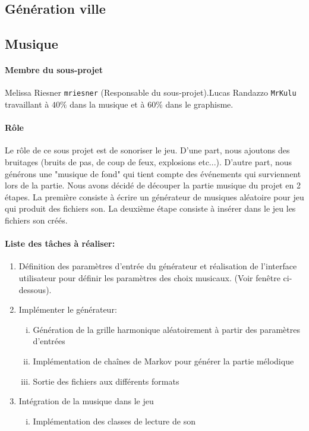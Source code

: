 \documentclass[a4paper,10pt]{article}
\begin{document}
\subsection{Génération ville}
\subsection{Musique} 
\paragraph{Membre du sous-projet} Melissa Riesner \verb!mriesner! (Responsable du sous-projet).Lucas Randazzo \verb!MrKulu! travaillant à $40\%$ dans la musique et à $60\%$ dans le graphisme. 
\paragraph{Rôle}
Le rôle de ce sous projet est de sonoriser le jeu. D'une part, nous ajoutons des bruitages (bruits de pas, de coup de feux, explosions etc...). D'autre part, nous générons une "musique de fond" qui tient compte des événements qui surviennent lors de la partie.
Nous avons décidé de découper la partie musique du projet en 2 étapes. La première consiste à  écrire un générateur de musiques aléatoire pour  jeu qui produit des fichiers son.  La deuxième étape consiste à insérer dans le jeu les fichiers  son créés.


\paragraph{Liste des tâches à réaliser:}
\begin{enumerate}
 \item Définition des paramètres d’entrée du générateur et réalisation de l’interface utilisateur pour définir les paramètres des choix musicaux. (Voir fenêtre ci-dessous).
 \item Implémenter le générateur:
 \begin{enumerate}[(i)]
  \item Génération de la grille harmonique aléatoirement à partir des paramètres d’entrées
  \item Implémentation de chaînes de Markov pour générer la partie mélodique
  \item Sortie des fichiers aux différents formats
 \end{enumerate}
 \item Intégration de la musique dans le jeu
 \begin{enumerate}[(i)]
 \item Implémentation des classes de lecture de son 
 \end{enumerate}
 

\end{enumerate}
\end{document}
